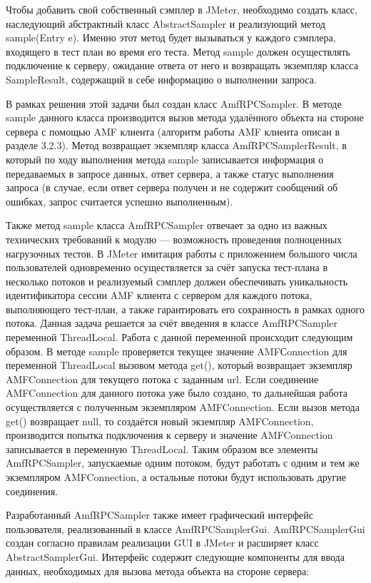 Чтобы добавить свой собственный сэмплер в JMeter, необходимо создать класс, наследующий абстрактный класс AbstractSampler и 
реализующий метод sample(Entry e). Именно этот метод будет вызываться у каждого сэмплера, входящего в
тест план во время его теста. Метод sample должен осуществлять подключение к серверу, ожидание ответа от него и возвращать
экземпляр класса SampleResult, содержащий в себе информацию о выполнении запроса.

В рамках решения этой задачи был создан класс AmfRPCSampler. В методе sample данного класса производится вызов метода 
удалённого объекта на стороне сервера с помощью AMF клиента (алгоритм работы AMF клиента описан в разделе 3.2.3). 
Метод возвращает экземпляр класса AmfRPCSamplerResult, в который по ходу выполнения метода sample записывается информация 
о передаваемых в запросе данных, ответ сервера, а также статус выполнения запроса (в случае, если ответ сервера получен и
не содержит сообщений об ошибках, запрос считается успешно выполненным).

Также метод sample класса AmfRPCSampler отвечает за одно из важных технических требований к модулю --- возможность проведения 
полноценных нагрузочных тестов. В JMeter имитация работы с приложением большого числа пользователей одновременно осуществляется 
за счёт запуска тест-плана в несколько потоков и реализуемый сэмплер должен обеспечивать уникальность идентификатора сессии AMF
клиента с сервером для каждого потока, выполняющего тест-план, а также гарантировать его сохранность в рамках одного потока. 
Данная задача решается за счёт введения в классе AmfRPCSampler переменной ThreadLocal.
Работа с данной переменной происходит следующим образом. В методе sample проверяется текущее значение AMFСonnection для
переменной ThreadLocal вызовом метода get(), который возвращает экземпляр AMFConnection для текущего потока с заданным url.
Если соединение AMFConnection для данного потока уже было создано, то дальнейшая работа осуществляется с полученным экземпляром 
AMFConnection. Если вызов метода get() возвращает null, то создаётся новый экземпляр AMFConnection, производится попытка
подключения к серверу и значение AMFConnection записывается в переменную ThreadLocal. Таким образом все элементы AmfRPCSampler,
запускаемые одним потоком, будут работать с одним и тем же экземпляром AMFConnection, а остальные потоки будут использовать другие 
соединения.

Разработанный AmfRPCSampler также имеет графический интерфейс пользователя, реализованный в классе AmfRPCSamplerGui. AmfRPCSamplerGui 
создан согласно правилам реализации GUI в JMeter и расширяет класс AbstractSamplerGui. Интерфейс содержит следующие компоненты для ввода данных, 
необходимых для вызова метода объекта на стороне сервера:

